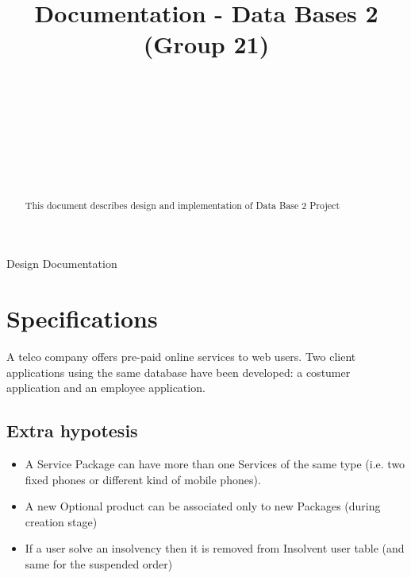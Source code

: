 \documentclass{article}
\begin{document}
\lstset{language=SQL}
\title{Documentation - Data Bases 2 (Group 21)%
%
}

\author{\\[2pt] 
\\
\\
\and
\\
\\
\\
}

%
%
{Design Documentation}

\maketitle

\begin{abstract}
This document describes design and implementation of Data Base 2 Project
\end{abstract}

\section{Specifications}
\label{intro}
A telco company offers pre-paid online services to web users. Two client applications using the same database have been developed: a costumer application and an employee application.
\subsection{Extra hypotesis}
\begin{itemize}
	\item A Service Package can have more than one Services of the same type (i.e. two fixed phones or different kind of mobile phones).
	\item A new Optional product can be associated only to new Packages (during creation stage)
	\item If a user solve an insolvency then it is removed from Insolvent user table (and same for the suspended order)
\end{itemize}
\newpage
\end{document}
